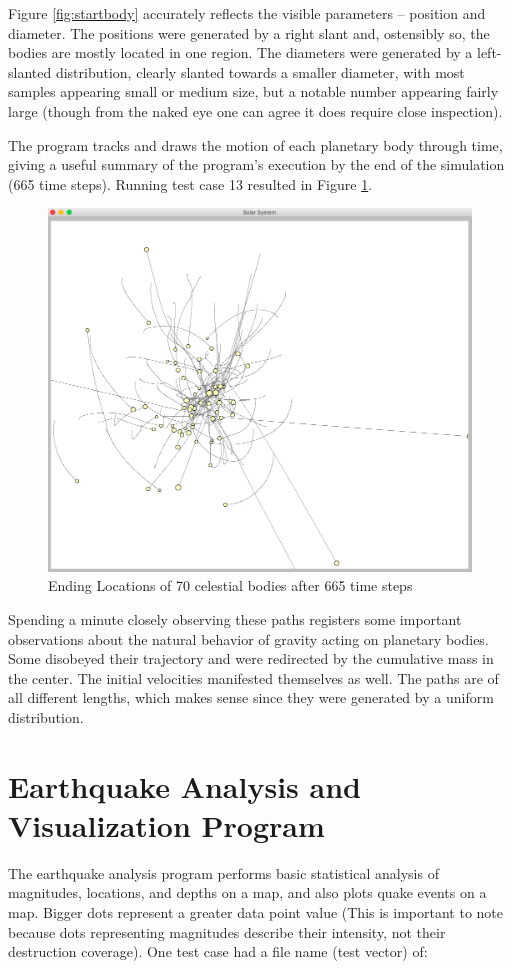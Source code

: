 Figure \ref{fig:startbody} accurately reflects the visible parameters – position and diameter. The positions were generated by a right slant and, ostensibly so, the bodies are mostly located in one region. The diameters were generated by a left-slanted distribution, clearly slanted towards a smaller diameter, with most samples appearing small or medium size, but a notable number appearing fairly large (though from the naked eye one can agree it does require close inspection).

The program tracks and draws the motion of each planetary body through time, giving a useful summary of the program's execution by the end of the simulation (665 time steps). Running test case 13 resulted in Figure \ref{fig:endbody}.

\begin{figure}[h!]
\centering
\includegraphics[scale=0.4]{final-ex.png}
\caption{Ending Locations of 70 celestial bodies after 665 time steps}
\label{fig:endbody}
\end{figure}

Spending a minute closely observing these paths registers some important observations about the natural behavior of gravity acting on planetary bodies. Some disobeyed their trajectory and were redirected by the cumulative mass in the center. The initial velocities manifested themselves as well. The paths are of all different lengths, which makes sense since they were generated by a uniform distribution.

\section{Earthquake Analysis and Visualization Program}
The earthquake analysis program performs basic statistical analysis of magnitudes, locations, and depths on a map, and also plots quake events on a map. Bigger dots represent a greater data point value (This is important to note because dots representing magnitudes describe their intensity, not their destruction coverage). One test case had a file name (test vector) of:
\vspace{1cm}

